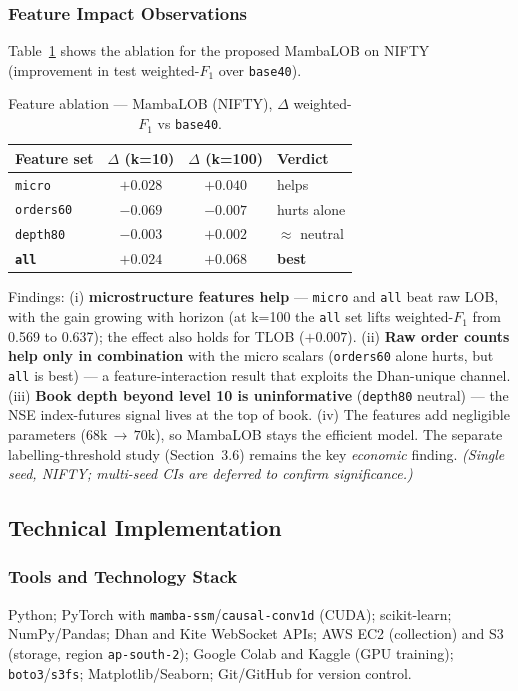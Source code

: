 \documentclass[11pt]{article}
\begin{document}
\subsubsection{Feature Impact Observations}
Table~\ref{tab:featabl} shows the ablation for the proposed MambaLOB on NIFTY (improvement in test
weighted-$F_1$ over \texttt{base40}).
\begin{table}[h]
\centering
\caption{Feature ablation --- MambaLOB (NIFTY), $\Delta$ weighted-$F_1$ vs \texttt{base40}.}
\label{tab:featabl}
\begin{tabular}{@{}lccl@{}}
\toprule
Feature set & $\Delta$ (k=10) & $\Delta$ (k=100) & Verdict \\
\midrule
\texttt{micro}    & $+0.028$ & $+0.040$ & helps \\
\texttt{orders60} & $-0.069$ & $-0.007$ & hurts alone \\
\texttt{depth80}  & $-0.003$ & $+0.002$ & $\approx$ neutral \\
\textbf{\texttt{all}} & $\mathbf{+0.024}$ & $\mathbf{+0.068}$ & \textbf{best} \\
\bottomrule
\end{tabular}
\end{table}
Findings: (i) \textbf{microstructure features help} --- \texttt{micro} and \texttt{all} beat raw LOB, with the
gain growing with horizon (at k=100 the \texttt{all} set lifts weighted-$F_1$ from 0.569 to 0.637); the effect
also holds for TLOB ($+0.007$). (ii) \textbf{Raw order counts help only in combination} with the micro scalars
(\texttt{orders60} alone hurts, but \texttt{all} is best) --- a feature-interaction result that exploits the
Dhan-unique channel. (iii) \textbf{Book depth beyond level 10 is uninformative} (\texttt{depth80} neutral) ---
the NSE index-futures signal lives at the top of book. (iv) The features add negligible parameters
($68$k\,$\rightarrow$\,$70$k), so MambaLOB stays the efficient model. The separate labelling-threshold study
(Section~3.6) remains the key \emph{economic} finding. \emph{(Single seed, NIFTY; multi-seed CIs are deferred
to confirm significance.)}

\subsection{Technical Implementation}
\subsubsection{Tools and Technology Stack}
Python; PyTorch with \texttt{mamba-ssm}/\texttt{causal-conv1d} (CUDA); scikit-learn; NumPy/Pandas; Dhan and
Kite WebSocket APIs; AWS EC2 (collection) and S3 (storage, region \texttt{ap-south-2}); Google Colab and
Kaggle (GPU training); \texttt{boto3}/\texttt{s3fs}; Matplotlib/Seaborn; Git/GitHub for version control.
\end{document}
